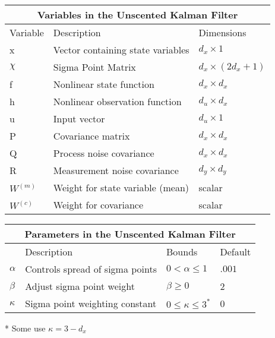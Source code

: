 \begin{enumerate}
\newpage            
\centering
\begin{center}
\begin{tabular}{ |p{2cm}||p{5cm}|p{2cm}| }
    \hline
    \multicolumn{3}{|c|}{Variables in the Unscented Kalman Filter } \\ 
    \hline
    Variable & Description & Dimensions \\
    \hline
    x & Vector containing state variables & $d_x \times 1 $\\ 
    $\chi $& Sigma Point Matrix &$ d_x \times (2 d_x + 1) $\\
    f & Nonlinear state function & $d_x \times d_x $  \\ 
    h & Nonlinear observation function & $d_u \times d_x$\\
    u & Input vector  & $d_u \times 1$\\
    P & Covariance matrix & $d_x \times d_x $  \\
    Q & Process noise covariance & $d_x \times d_x $  \\
    R & Measurement noise covariance & $d_y \times d_y $  \\
     $W^{(m)}$ & Weight for state variable (mean) & scalar \\
    $W^{(c)}$ & Weight for covariance & scalar \\
    \hline
\end{tabular} 
\end{center}

\begin{center}
\begin{tabular}{ |p{1cm}||p{5cm}|p{2cm}| p{1cm}| }
    \hline
    \multicolumn{4}{|c|}{Parameters in the Unscented Kalman Filter } \\ 
    \hline
     & Description & Bounds & Default \\
    \hline
    $\alpha$ & Controls spread of sigma points & $0 < \alpha \leq 1$ & $.001$\\
    $\beta$ & Adjust sigma point weight & $\beta \geq 0$ & 2\\
    $\kappa $ & Sigma point weighting constant & $0 \leq \kappa \leq 3^{*}$  & 0 \\
    \hline
\end{tabular}
\end{center}
* Some use $\kappa  = 3 - d_x$             
            
            
            
            
            
            
            
    
    
        
\end{enumerate}